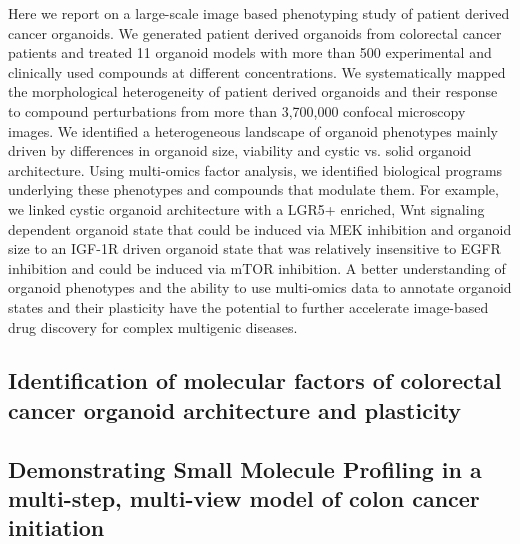 \begin{flushleft}
Here we report on a large-scale image based phenotyping study of patient derived cancer organoids. We generated patient derived organoids from colorectal cancer patients and treated 11 organoid models with more than 500 experimental and clinically used compounds at different concentrations. We systematically mapped the morphological heterogeneity of patient derived organoids and their response to compound perturbations from more  than  3,700,000  confocal microscopy images. We identified a heterogeneous landscape of organoid phenotypes mainly driven by differences in organoid size, viability and cystic vs. solid organoid architecture. Using multi-omics factor analysis, we identified biological programs underlying these phenotypes and compounds that modulate them. For example, we linked cystic organoid architecture with a LGR5+ enriched, Wnt signaling dependent organoid state that could be induced via MEK inhibition and organoid size to an IGF-1R driven organoid state that was relatively insensitive to EGFR inhibition and could be induced via mTOR inhibition. A better understanding of organoid phenotypes and the ability to use multi-omics data to annotate organoid states and their plasticity have the potential to further accelerate image-based drug discovery for complex multigenic diseases.


\subsection{Identification of molecular factors of colorectal cancer organoid architecture and plasticity}
\subsection{Demonstrating Small Molecule Profiling in a multi-step, multi-view model of colon cancer initiation}
\end{flushleft}



